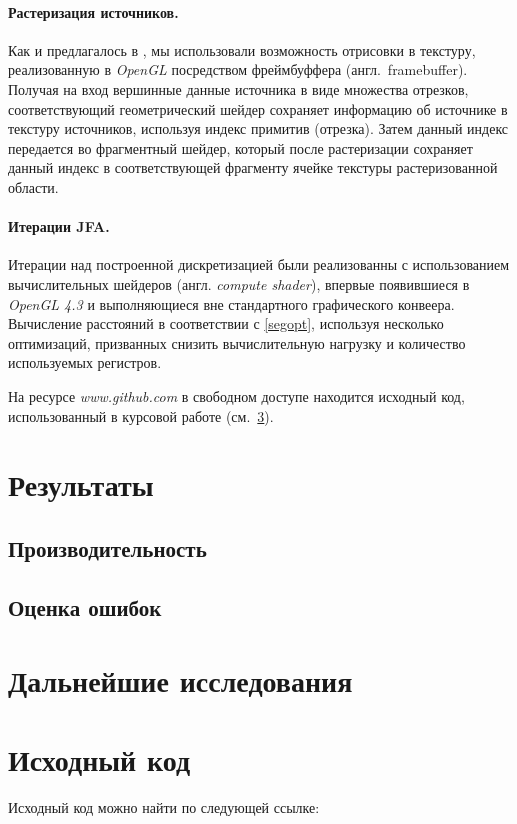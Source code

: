 \documentclass[12pt]{article}
\begin{document}
\paragraph{Растеризация источников.} Как и предлагалось в \cite{gvd}, мы 
использовали возможность отрисовки в текстуру, реализованную в \emph{OpenGL}
посредством фреймбуффера (англ.~framebuffer). Получая на вход вершинные данные
источника в виде множества отрезков, соответствующий геометрический шейдер 
сохраняет информацию об источнике в текстуру источников, используя индекс
примитив (отрезка). Затем данный индекс передается во фрагментный шейдер,
который после растеризации сохраняет данный индекс в соответствующей фрагменту
ячейке текстуры растеризованной области.

\paragraph{Итерации JFA.} Итерации над построенной дискретизацией были
реализованны с использованием вычислительных шейдеров (англ. \emph{compute shader}),
впервые появившиеся в \emph{OpenGL 4.3} и выполняющиеся вне стандартного
графического конвеера. Вычисление расстояний в соответствии с \ref{segopt},
используя несколько оптимизаций, призванных снизить вычислительную нагрузку и 
количество используемых регистров.

На ресурсе \emph{www.github.com} в свободном доступе находится исходный код, 
использованный в курсовой работе (см.~\ref{source}).

\section{Результаты}


\subsection{Производительность}
\subsection{Оценка ошибок}
\section{Дальнейшие исследования}

\pagebreak

\section{Исходный код}
\label{source}
Исходный код можно найти по следующей ссылке: 
\end{document}

